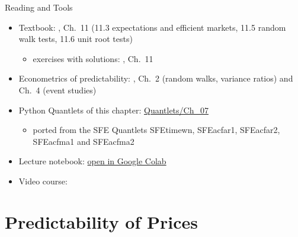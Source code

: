 \begin{frame}{Reading and Tools}
\itemsize{\small}
\begin{itemize}
    \item Textbook: , Ch.~11 (11.3 expectations and efficient markets, 11.5 random walk tests, 11.6 unit root tests)
    \begin{itemize}
        \item exercises with solutions: , Ch.~11
    \end{itemize}
    \item Econometrics of predictability: , Ch.~2 (random walks, variance ratios) and Ch.~4 (event studies)
    \item Python Quantlets of this chapter: \href{https://github.com/danpele/SFM/tree/main/Quantlets/Ch_07}{Quantlets/Ch\_07}
    \begin{itemize}
        \item ported from the SFE Quantlets SFEtimewn, SFEacfar1, SFEacfar2, SFEacfma1 and SFEacfma2
    \end{itemize}
    \item Lecture notebook: \href{\colaburl{notebooks/EN/chapter7_lecture_notebook.ipynb}}{open in Google Colab}
    \item Video course: 
\end{itemize}
\end{frame}


\section{Predictability of Prices}

